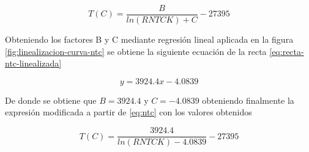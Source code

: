 \begin{equation}
	T(C) = \frac{B}{ln(R NTC K) + C} - 27395
	\label{eq:ntc}
\end{equation}

Obteniendo los factores B y C mediante regresión lineal aplicada en la figura \ref{fig:linealizacion-curva-ntc} se obtiene la siguiente ecuación de la recta \ref{eq:recta-ntc-linealizada}

\begin{equation}
	y = 3924.4x - 4.0839
	\label{eq:recta-ntc-linealizada}
\end{equation}

De donde se obtiene que $B = 3924.4$ y $C = -4.0839$ obteniendo finalmente la expresión modificada a partir de \ref{eq:ntc} con los valores obtenidos

\begin{equation}
	T(C) = \frac{3924.4}{ln(R NTC K) - 4.0839} - 27395
\end{equation}
